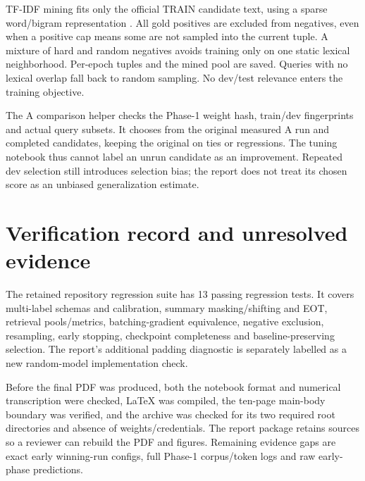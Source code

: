 TF-IDF mining fits only the official TRAIN candidate text, using a sparse word/bigram representation
\cite{sklearn}. All gold positives are excluded from negatives, even when a positive cap means some are
not sampled into the current tuple. A mixture of hard and random negatives avoids training only on one
static lexical neighborhood. Per-epoch tuples and the mined pool are saved. Queries with no lexical
overlap fall back to random sampling. No dev/test relevance enters the training objective.

The A comparison helper checks the Phase-1 weight hash, train/dev fingerprints and actual query subsets.
It chooses from the original measured A run and completed candidates, keeping the original on ties or
regressions. The tuning notebook thus cannot label an unrun candidate as an improvement. Repeated
dev selection still introduces selection bias; the report does not treat its chosen score as an unbiased
generalization estimate.

\section{Verification record and unresolved evidence}
The retained repository regression suite has 13 passing regression tests. It covers multi-label schemas and
calibration, summary masking/shifting and EOT, retrieval pools/metrics, batching-gradient equivalence,
negative exclusion, resampling, early stopping, checkpoint completeness and baseline-preserving selection.
The report's additional padding diagnostic is separately labelled as a new random-model
implementation check.

Before the final PDF was produced, both the notebook format and numerical transcription were checked,
LaTeX was compiled, the ten-page main-body boundary was verified, and the archive was checked for its
two required root directories and absence of weights/credentials. The report package retains sources
so a reviewer can rebuild the PDF and figures. Remaining evidence gaps are exact early winning-run
configs, full Phase-1 corpus/token logs and raw early-phase predictions.
